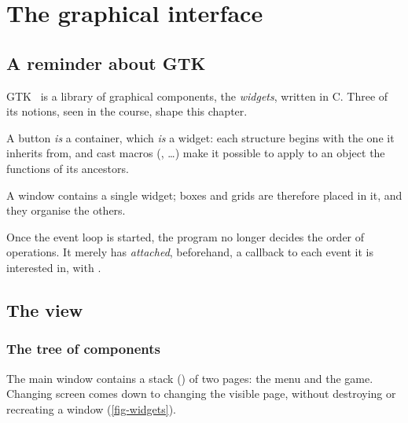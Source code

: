 \chapter{The graphical interface}
\label{chap-interface}

\section{A reminder about GTK}

GTK~\cite{gtk3} is a library of graphical components, the \emph{widgets}, written in C.
Three of its notions, seen in the course, shape this chapter.

\begin{description}[style=nextline, leftmargin=1.2em]
    \item[Inheritance by inclusion] A button \emph{is} a container, which \emph{is} a
          widget: each structure begins with the one it inherits from, and cast macros
          (, \dots) make it possible to apply to an object
          the functions of its ancestors.
    \item[Containers] A window contains a single widget; boxes and grids are therefore
          placed in it, and they organise the others.
    \item[Event-driven programming] Once the event loop is started, the program no longer
          decides the order of operations. It merely has \emph{attached}, beforehand, a callback
          to each event it is interested in, with .
\end{description}

\section{The view}

\subsection{The tree of components}

The main window contains a stack () of two pages: the menu and the game.
Changing screen comes down to changing the visible page, without destroying or recreating a
window (\cref{fig-widgets}).

